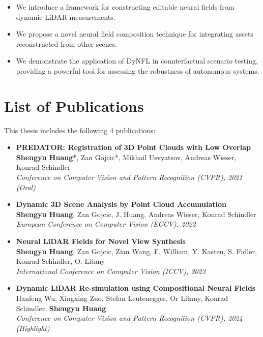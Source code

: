 \begin{itemize}
\item We introduce a framework for constructing editable neural fields from dynamic LiDAR measurements.
\item We propose a novel neural field composition technique for integrating assets reconstructed from other scenes.
\item We demonstrate the application of DyNFL in counterfactual scenario testing, providing a powerful tool for assessing the robustness of autonomous systems.
\end{itemize}

\section{List of Publications}

This thesis includes the following 4 publications:
\begin{itemize}
    \item \noindent\textbf{ PREDATOR: Registration of 3D Point Clouds with Low Overlap} \\[0.5em]
    \textbf{Shengyu Huang}*, Zan Gojcic*, Mikhail Usvyatsov, Andreas Wieser, Konrad Schindler \\
    \textit{Conference on Computer Vision and Pattern Recognition (CVPR), 2021 (Oral)}
    
    \item \noindent\textbf{ Dynamic 3D Scene Analysis by Point Cloud Accumulation} \\[0.5em]
    \textbf{Shengyu Huang}, Zan Gojcic, J. Huang, Andreas Wieser, Konrad Schindler \\
    \textit{European Conference on Computer Vision (ECCV), 2022}
    
    \item \noindent\textbf{ Neural LiDAR Fields for Novel View Synthesis} \\[0.5em]
    \textbf{Shengyu Huang}, Zan Gojcic, Zian Wang, F. William, Y. Kasten, S. Fidler, Konrad Schindler, O. Litany \\
    \textit{International Conference on Computer Vision (ICCV), 2023}
    
    \item \noindent\textbf{ Dynamic LiDAR Re-simulation using Compositional Neural Fields} \\[0.5em]
    Hanfeng Wu, Xingxing Zuo, Stefan Leutenegger, Or Litany, Konrad Schindler, \textbf{Shengyu Huang} \\
    \textit{Conference on Computer Vision and Pattern Recognition (CVPR), 2024 (Highlight)}
\end{itemize}

